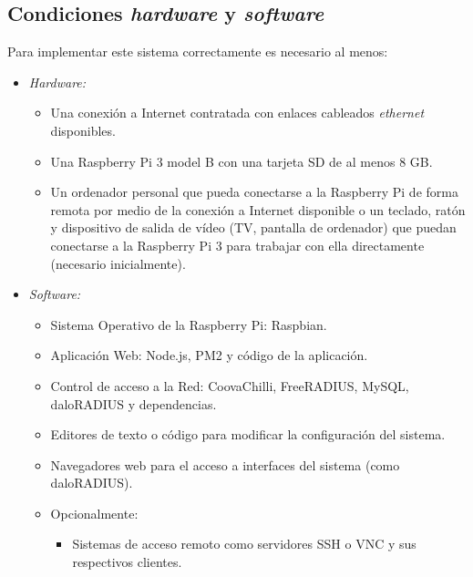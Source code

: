\subsection*{Condiciones \emph{hardware} y \emph{software}}

Para implementar este sistema correctamente es necesario al menos:
\begin{itemize}
\item \emph{Hardware:}
\begin{itemize}
\item Una conexión a Internet contratada con enlaces cableados \emph{ethernet} disponibles.
\item Una Raspberry Pi 3 model B con una tarjeta SD de al menos 8 GB.
\item Un ordenador personal que pueda conectarse a la Raspberry Pi de forma remota por medio de la conexión a Internet disponible o un teclado, ratón y dispositivo de salida de vídeo (TV, pantalla de ordenador) que puedan conectarse a la Raspberry Pi 3 para trabajar con ella directamente (necesario inicialmente).
\end{itemize}
\item \emph{Software:}
\begin{itemize}
\item Sistema Operativo de la Raspberry Pi: Raspbian.
\item Aplicación Web: Node.js, PM2 y código de la aplicación.
\item Control de acceso a la Red: CoovaChilli, FreeRADIUS, MySQL, daloRADIUS y dependencias.
\item Editores de texto o código para modificar la configuración del sistema.
\item Navegadores web para el acceso a interfaces del sistema (como daloRADIUS).
\item Opcionalmente:
\begin{itemize}
\item Sistemas de acceso remoto como servidores \acrshort{SSH} o \acrshort{VNC} y sus respectivos clientes.
\end{itemize}
\end{itemize}
\end{itemize}


